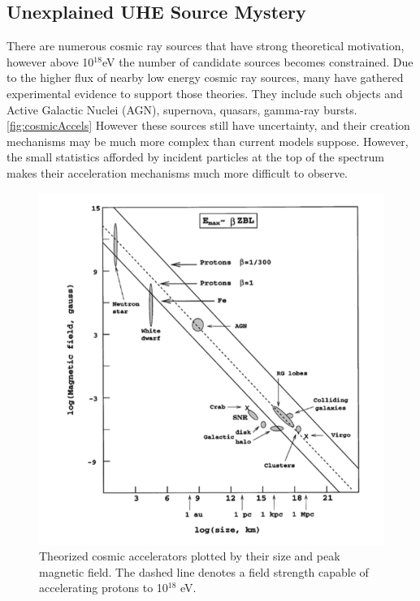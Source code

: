 		
		
	\subsection{Unexplained UHE Source Mystery}
		There are numerous cosmic ray sources that have strong theoretical motivation, however above 10$^{18}$eV the number of candidate sources becomes constrained.\cite{RevModPhys.71.S33}  Due to the higher flux of nearby low energy cosmic ray sources, many have gathered experimental evidence to support those theories.  They include such objects and Active Galactic Nuclei (AGN), supernova, quasars, gamma-ray bursts.\ref{fig:cosmicAccels}  However these sources still have uncertainty, and their creation mechanisms may be much more complex than current models suppose.  However, the small statistics afforded by incident particles at the top of the spectrum makes their acceleration mechanisms much more difficult to observe.

\begin{figure}
\label{fig:cosmicAccel}
	\includegraphics[width=\textwidth]{figures/cosmicAccelerators}
	\caption{Theorized cosmic accelerators plotted by their size and peak magnetic field.  The dashed line denotes a field strength capable of accelerating protons to 10${^18}$ eV. \cite{RevModPhys.71.S33} }
\end{figure}


